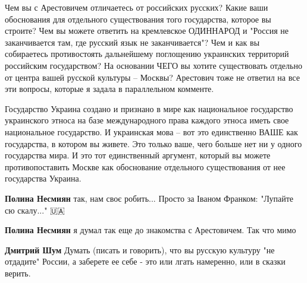 \begin{itemize}
\begin{itemize}
Чем вы с Арестовичем отличаетесь от российских русских? Какие ваши обоснования
для отдельного существования того государства, которое вы строите? Чем вы
можете ответить на кремлевское ОДИННАРОД и "Россия не заканчивается там, где
русский язык не заканчивается"? Чем и как вы собираетесь противостоять
дальнейшему поглощению украинских территорий российским государством? На
основании ЧЕГО вы хотите существовать отдельно от центра вашей русской культуры
– Москвы? Арестович тоже не ответил на все эти вопросы, которые я задала в
параллельном комменте.

Государство Украина создано и признано в мире как национальное государство
украинского этноса на базе международного права каждого этноса иметь свое
национальное государство. И украинская мова – вот это единственно ВАШЕ как
государства, в котором вы живете. Это только ваше, чего больше нет ни у одного
государства мира. И это тот единственный аргумент, который вы можете
противопоставить Москве как обоснование отдельного существования от нее
государства Украина.

 
\textbf{Полина Несмиян} так, нам своє робить... Просто за Іваном Франком: "Лупайте сю скалу..." 🇺🇦

 
\textbf{Полина Несмиян} я думал так еще до знакомства с Арестовичем. Так что мимо

 
\textbf{Дмитрий Шум} Думать (писать и говорить), что вы русскую культуру "не
отдадите" России, а заберете ее себе - это или лгать намеренно, или в сказки
верить.

 

\end{itemize}
\end{itemize}
